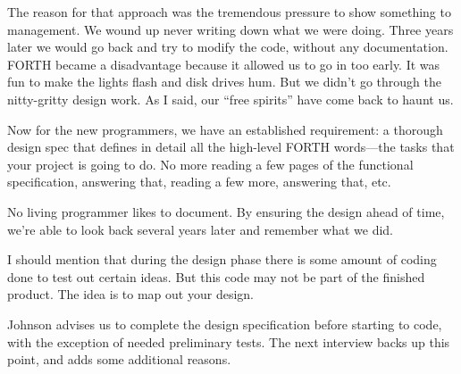 \begin{interview}
\begin{tfquot}
The reason for that approach was the tremendous pressure to show
something to management. We wound up never writing down what we were
doing. Three years later we would go back and try to modify the code,
without any documentation. FORTH became a disadvantage because it
allowed us to go in too early. It was fun to make the lights flash and
disk drives hum. But we didn't go through the nitty-gritty design
work. As I said, our ``free spirits'' have come back to haunt us.

Now for the new programmers, we have an established requirement: a
thorough design spec that defines in detail all the high-level FORTH
words---the tasks that your project is going to do. No more reading a
few pages of the functional specification, answering that, reading a
few more, answering that, etc.

No living programmer likes to document. By ensuring the design ahead of
time, we're able to look back several years later and remember what we did.

I should mention that during the design phase there is some amount of
coding done to test out certain ideas. But this code may not be part
of the finished product. The idea is to map out your design.
\end{tfquot}
\end{interview}
Johnson advises us to complete the design specification before starting
to code, with the exception of needed preliminary tests. The next
interview backs up this point, and adds some additional reasons.
